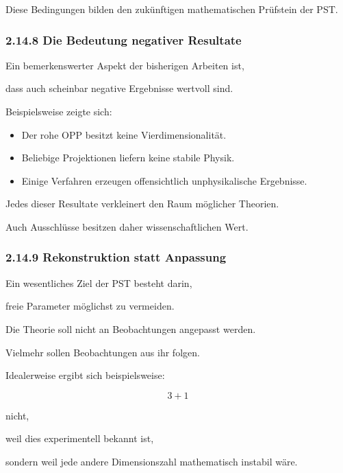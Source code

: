 Diese Bedingungen bilden den zukünftigen mathematischen Prüfstein der PST.


\subsubsection*{2.14.8 Die Bedeutung negativer Resultate}

Ein bemerkenswerter Aspekt der bisherigen Arbeiten ist,

dass auch scheinbar negative Ergebnisse wertvoll sind.

Beispielsweise zeigte sich:

\begin{itemize}

\item Der rohe OPP besitzt keine Vierdimensionalität.

\item Beliebige Projektionen liefern keine stabile Physik.

\item Einige Verfahren erzeugen offensichtlich unphysikalische Ergebnisse.

\end{itemize}

Jedes dieser Resultate verkleinert den Raum möglicher Theorien.

Auch Ausschlüsse besitzen daher wissenschaftlichen Wert.


\subsubsection*{2.14.9 Rekonstruktion statt Anpassung}

Ein wesentliches Ziel der PST besteht darin,

freie Parameter möglichst zu vermeiden.

Die Theorie soll nicht an Beobachtungen angepasst werden.

Vielmehr sollen Beobachtungen aus ihr folgen.

Idealerweise ergibt sich beispielsweise:

\[
3+1
\]

nicht,

weil dies experimentell bekannt ist,

sondern weil jede andere Dimensionszahl mathematisch instabil wäre.

